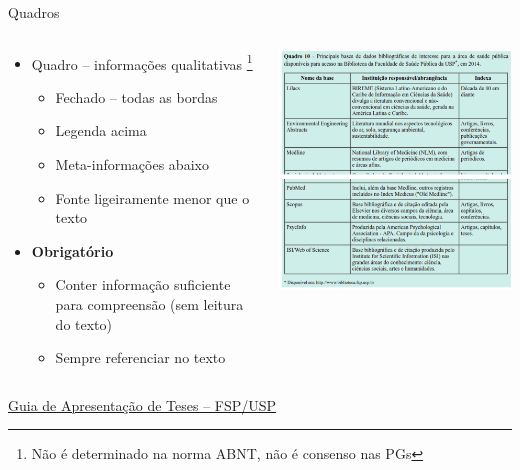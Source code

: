 \documentclass{beamer}
\begin{document}
\begin{frame}{Quadros}
  \begin{columns}%
    \begin{column}{.5\textwidth}
      \begin{itemize}
        \footnotesize
      \item Quadro -- informações qualitativas
        \footnote[frame]{\scriptsize Não é determinado na norma ABNT, não é consenso nas PGs}
        \begin{itemize}
          \scriptsize
        \item Fechado -- todas as bordas
        \item Legenda acima
        \item Meta-informações abaixo
        \item Fonte ligeiramente menor que o texto
        \end{itemize}
        \bigskip
      \item \alert{\bf Obrigatório}
        \begin{itemize}
          \scriptsize
        \item Conter informação suficiente para compreensão ({\tiny sem leitura do texto})
        \item Sempre referenciar no texto
        \end{itemize}
      \end{itemize}
    \end{column}
    \begin{column}{.5\textwidth}
      \includegraphics[height=.8\textheight]{EstruturaII/obj-quadro}
    \end{column}
  \end{columns}

  \vfill
  \scriptsize
  \hfill \href{http://www.biblioteca.fsp.usp.br/~biblioteca/guia/i_cap_04.htm}
  {Guia de Apresentação de Teses -- FSP/USP}
\end{frame}
\end{document}
